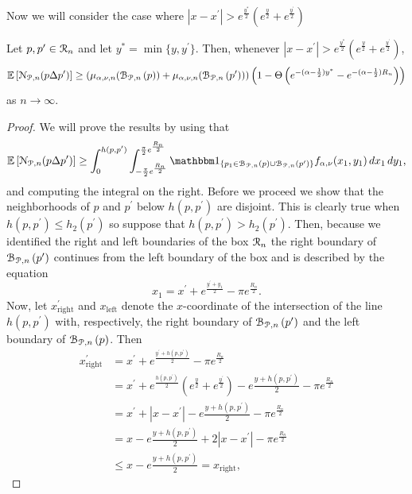 \begin{appendices}
Now we will consider the case where $|x - x^\prime| > e^{\frac{y^\ast}{2}}\left(e^{\frac{y}{2}} + e^{\frac{y^\prime}{2}}\right)$

\begin{lemma}\label{lem:disjoint_neighbors_P_n_large}
Let $p, p ^\prime \in {\mathcal R}_n$ and let $y^\ast = \min\{y,y^\prime\}$. Then, whenever $|x - x^\prime| > e^{\frac{y^\ast}{2}}\left(e^{\frac{y}{2}} + e^{\frac{y^\prime}{2}}\right)$,
\[
	\mathbb{E}\left[{\mathcal N}_{{\mathcal P},n}(p\Delta p^\prime)\right]
	\ge \left(\mu_{\alpha,\nu ,n}({\mathcal B}_{{\mathcal P},n}\left(p\right)) + \mu_{\alpha,\nu ,n}({\mathcal B}_{{\mathcal P},n}\left(p^\prime\right))\right)
		\left(1-\Theta\left(e^{-(\alpha - \frac{1}{2})y^\ast} - e^{-(\alpha - \frac{1}{2})R_n}\right)\right)
\]
as $n \to \infty$.
\end{lemma}

\begin{proof}
We will prove the results by using that
\[
	\Exp{\Ncal_{\Pcal,n}(p\Delta p^\prime)} 
	\ge \int_0^{h(p,p^\prime)} \int_{-\frac{\pi}{2}e^{\frac{R_n}{2}}}^{\frac{\pi}{2}e^{\frac{R_n}{2}}} \ind{p_1 \in \BallPon{p} \cup \BallPon{p^\prime}} f_{\alpha,\nu}(x_1,y_1) \, dx_1 \, dy_1,
\]
and computing the integral on the right. Before we proceed we show that the neighborhoods of $p$ and $p^\prime$ below $h(p,p^\prime)$ are disjoint. This is clearly true when $h(p,p^\prime) \le h_2(p^\prime)$ so suppose that $h(p,p^\prime) > h_2(p^\prime)$. Then, because we identified the right and left boundaries of the box ${\mathcal R}_n$ the right boundary of ${\mathcal B}_{{\mathcal P},n}\left(p^\prime\right)$ continues from the left boundary of the box and is described by the equation
\[
	x_1 = x^\prime + e^{\frac{y^\prime + y_1}{2}} - \pi e^{\frac{R_n}{2}}.
\]
Now, let $x_{\mathrm{right}}^\prime$ and $x_{\mathrm{left}}$ denote the $x$-coordinate of the intersection of the line $h(p,p^\prime)$ with, respectively, the right boundary of ${\mathcal B}_{{\mathcal P},n}\left(p^\prime\right)$ and the left boundary of ${\mathcal B}_{{\mathcal P},n}\left(p\right)$. Then
\begin{align*}
	x_{\mathrm{right}}^\prime &= x^\prime + e^{\frac{y^\prime + h(p,p^\prime)}{2}} - \pi e^{\frac{R_n}{2}}\\
	&= x^\prime + e^{\frac{h(p,p^\prime)}{2}}\left(e^{\frac{y}{2}} + e^{\frac{y^\prime}{2}}\right)
		- e{\frac{y + h(p,p^\prime)}{2}} - \pi e^{\frac{R_n}{2}}\\
	&= x^\prime + |x - x^\prime| - e{\frac{y + h(p,p^\prime)}{2}} - \pi e^{\frac{R_n}{2}}\\
	&= x - e{\frac{y + h(p,p^\prime)}{2}} + 2|x - x^\prime| - \pi e^{\frac{R_n}{2}}\\
	&\le x - e{\frac{y + h(p,p^\prime)}{2}} = x_{\mathrm{right}},

\end{align*}
\end{proof}
\end{appendices}
